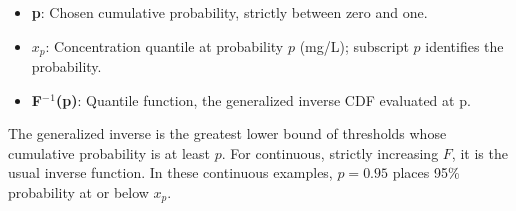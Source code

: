 \documentclass[11pt,a4paper]{article}
\begin{document}
\begin{samepage}
\begin{itemize}\setlength{\itemsep}{1pt}\setlength{\parsep}{0pt}
\item \textbf{p}: Chosen cumulative probability, strictly between zero and one.
\item \textbf{\(x_p\)}: Concentration quantile at probability \(p\) (mg/L); subscript \(p\) identifies the probability.
\item \textbf{F\ensuremath{{}^-}\ensuremath{{}^1}(p)}: Quantile function, the generalized inverse CDF evaluated at p.
\end{itemize}

The generalized inverse is the greatest lower bound of thresholds whose cumulative probability is at least \(p\). For continuous, strictly increasing \(F\), it is the usual inverse function. In these continuous examples, \(p = 0.95\) places 95\% probability at or below \(x_p\).

\end{samepage}
\medskip
\end{document}
